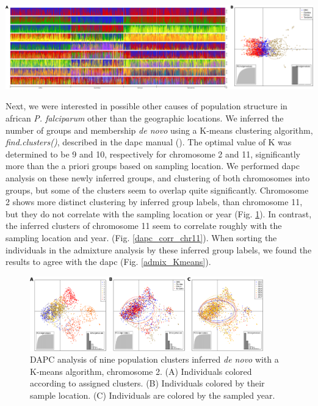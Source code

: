 \documentclass[11pt]{article}
\begin{document}
\begin{center}
\includegraphics[width=1\textwidth]{./figures/Population_structure_countries_chr11.png}
\end{center}

Next, we were interested in possible other causes of population structure in african \emph{P. falciparum} other than the geographic locations. We inferred the number of groups and membership \emph{de novo} using a K-means clustering algorithm, \emph{find.clusters()}, described in the dapc manual (\cite{jombart-2010-discr-analy}). The optimal value of K was determined to be 9 and 10, respectively for chromosome 2 and 11, significantly more than the a priori groups based on sampling location. We performed dapc analysis on these newly inferred groups, and clustering of both chromosomes into groups, but some of the clusters seem to overlap quite significantly. Chromosome 2 shows more distinct clustering by inferred group labels, than chromosome 11, but they do not correlate with the sampling location or year (Fig. \ref{dapc_corr_chr2}). In contrast, the inferred clusters of chromosome 11 seem to  correlate roughly with the sampling location and year. (Fig. \ref{dapc_corr_chr11}). When sorting the individuals in the admixture analysis by these inferred group labels, we found the results to agree with the dapc (Fig. \ref{admix_Kmeans}).

\begin{figure}[htbp]
\centering
\includegraphics[width=0.9\textwidth]{./figures/dapc_Kmeans_chr2.png}
\caption{\label{dapc_corr_chr2}DAPC analysis of nine population clusters inferred \emph{de novo} with a K-means algorithm, chromosome 2. (A) Individuals colored according to assigned clusters. (B) Individuals colored by their sample location. (C) Individuals are colored by the sampled year.}
\end{figure}
\end{document}
